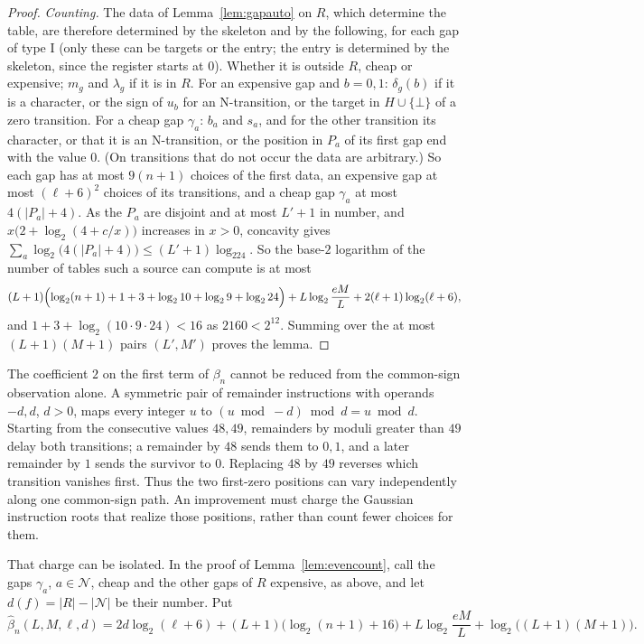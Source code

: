 \documentclass[11pt]{article}
\theoremstyle{remark}
\begin{document}
\begin{proof}
\emph{Counting.}  The data of Lemma~\ref{lem:gapauto} on $R$, which determine the table,
are therefore determined by the skeleton and by the following, for each gap of type
$\mathrm I$ (only these can be targets or the entry; the entry is determined by the
skeleton, since the register starts at $0$).  Whether it is outside $R$, cheap or
expensive; $m_g$ and $\lambda_g$ if it is in $R$.  For an expensive gap and $b=0,1$:
$\delta_g(b)$ if it is a character, or the sign of $u_b$ for an N-transition, or the target
in $H\cup\{\bot\}$ of a zero transition.  For a cheap gap $\gamma_a$: $b_a$ and $s_a$, and
for the other transition its character, or that it is an N-transition, or the position in
$P_a$ of its first gap end with the value $0$.  (On transitions that do not occur the data
are arbitrary.)  So each gap has at most $9(n+1)$ choices of the first data, an expensive
gap at most $(\ell+6)^2$ choices of its transitions, and a cheap gap $\gamma_a$ at most
$4(|P_a|+4)$.  As the $P_a$ are disjoint and at most $L'+1$ in number, and
$x\bigl(2+\log_2(4+c/x)\bigr)$ increases in $x>0$, concavity gives
$\sum_a\log_2\bigl(4(|P_a|+4)\bigr)\le(L'+1)\log_224$.  So the base-$2$ logarithm of the
number of tables such a source can compute is at most
\[
  (L+1)\Bigl(\log_2(n+1)+1+3+\log_210+\log_29+\log_224\Bigr)+L\log_2\frac{eM}L
  +2(\ell+1)\log_2(\ell+6),
\]
and $1+3+\log_2(10\cdot9\cdot24)<16$ as $2160<2^{12}$.  Summing over the at most $(L+1)(M+1)$ pairs
$(L',M')$ proves the lemma.
\end{proof}

The coefficient $2$ on the first term of $\beta_n$ cannot be reduced from
the common-sign observation alone.  A symmetric pair of remainder
instructions with operands $-d,d$, $d>0$, maps every integer $u$ to
$(u\bmod -d)\bmod d=u\bmod d$.  Starting from the consecutive values
$48,49$, remainders by moduli greater than $49$ delay both transitions;
a remainder by $48$ sends them to $0,1$, and a later remainder by $1$
sends the survivor to $0$.  Replacing $48$ by $49$ reverses which
transition vanishes first.  Thus the two first-zero positions can vary
independently along one common-sign path.  An improvement must charge the
Gaussian instruction roots that realize those positions, rather than count
fewer choices for them.

That charge can be isolated.  In the proof of Lemma~\ref{lem:evencount}, call
the gaps $\gamma_a$, $a\in\mathcal N$, cheap and the other gaps of $R$
expensive, as above, and let $d(f)=|R|-|\mathcal N|$ be their number.  Put
\[
 \widehat\beta_n(L,M,\ell,d)=2d\log_2(\ell+6)
 +(L+1)\bigl(\log_2(n+1)+16\bigr)
 +L\log_2\frac{eM}L+\log_2\bigl((L+1)(M+1)\bigr).
\]
\end{document}
